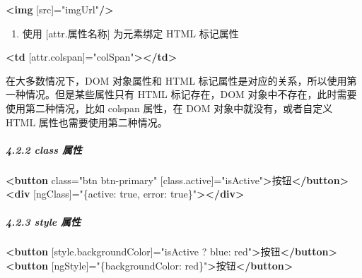 \documentclass[
]{article}
\newenvironment{Shaded}{}{}
\newcommand{\KeywordTok}[1]{\textcolor[rgb]{0.00,0.44,0.13}{\textbf{#1}}}
\newcommand{\NormalTok}[1]{#1}
\newcommand{\OtherTok}[1]{\textcolor[rgb]{0.00,0.44,0.13}{#1}}
\newcommand{\StringTok}[1]{\textcolor[rgb]{0.25,0.44,0.63}{#1}}
\begin{document}
\begin{Shaded}
\begin{Highlighting}[]
\KeywordTok{\textless{}img}\OtherTok{ [src]=}\StringTok{"imgUrl"}\KeywordTok{/\textgreater{}}
\end{Highlighting}
\end{Shaded}

\begin{enumerate}
\def\labelenumi{\arabic{enumi}.}
\item
  使用 {[}attr.属性名称{]} 为元素绑定 HTML 标记属性
\end{enumerate}

\begin{Shaded}
\begin{Highlighting}[]
\KeywordTok{\textless{}td}\OtherTok{ [attr.colspan]=}\StringTok{"colSpan"}\KeywordTok{\textgreater{}\textless{}/td\textgreater{}} 
\end{Highlighting}
\end{Shaded}

在大多数情况下，DOM 对象属性和 HTML
标记属性是对应的关系，所以使用第一种情况。但是某些属性只有 HTML
标记存在，DOM 对象中不存在，此时需要使用第二种情况，比如 colspan
属性，在 DOM 对象中就没有，或者自定义 HTML 属性也需要使用第二种情况。

\hypertarget{422-class-ux5c5eux6027}{%
\subparagraph{4.2.2 class 属性}\label{422-class-ux5c5eux6027}}

\begin{Shaded}
\begin{Highlighting}[]
\KeywordTok{\textless{}button}\OtherTok{ class=}\StringTok{"btn btn{-}primary"}\OtherTok{ [class.active]=}\StringTok{"isActive"}\KeywordTok{\textgreater{}}\NormalTok{按钮}\KeywordTok{\textless{}/button\textgreater{}}
\KeywordTok{\textless{}div}\OtherTok{ [ngClass]=}\StringTok{"\{\textquotesingle{}active\textquotesingle{}: true, \textquotesingle{}error\textquotesingle{}: true\}"}\KeywordTok{\textgreater{}\textless{}/div\textgreater{}}
\end{Highlighting}
\end{Shaded}

\hypertarget{423-style-ux5c5eux6027}{%
\subparagraph{4.2.3 style 属性}\label{423-style-ux5c5eux6027}}

\begin{Shaded}
\begin{Highlighting}[]
\KeywordTok{\textless{}button}\OtherTok{ [style.backgroundColor]=}\StringTok{"isActive ? \textquotesingle{}blue\textquotesingle{}: \textquotesingle{}red\textquotesingle{}"}\KeywordTok{\textgreater{}}\NormalTok{按钮}\KeywordTok{\textless{}/button\textgreater{}}
\KeywordTok{\textless{}button}\OtherTok{ [ngStyle]=}\StringTok{"\{\textquotesingle{}backgroundColor\textquotesingle{}: \textquotesingle{}red\textquotesingle{}\}"}\KeywordTok{\textgreater{}}\NormalTok{按钮}\KeywordTok{\textless{}/button\textgreater{}}
\end{Highlighting}
\end{Shaded}
\end{document}
